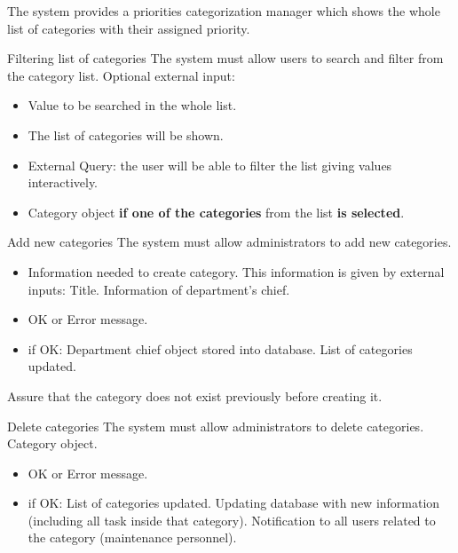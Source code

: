 
The system provides a priorities categorization manager which shows the whole list of categories with their assigned priority.

\begin{requirement}{Filtering list of categories}
\reqdesc The system must allow users to search and filter from the category list.
\reqin Optional external input:
\begin{itemize}
	\item Value to be searched in the whole list.
\end{itemize}
\reqout \begin{itemize}
	\item The list of categories will be shown.
	\item External Query: the user will be able to filter the list giving values interactively.
	\item Category object \textbf{if one of the categories} from the list \textbf{is selected}.
\end{itemize}
\end{requirement}


\begin{requirement}{Add new categories}
\reqdesc  The system must allow administrators to add new categories.
\reqin \begin{itemize}
	\item Information needed to create category. This information is given by external inputs:
		\subitem Title.
		\subitem Information of department's chief. 
\end{itemize}
\reqout \begin{itemize}
	\item OK or Error message.
	\item if OK:
		\subitem Department chief object stored into database.
		\subitem List of categories updated.
\end{itemize}
\reqsteps Assure that the category does not exist previously before creating it.
\end{requirement}

\begin{requirement}{Delete categories}
\reqdesc  The system must allow administrators to delete categories.
\reqin Category object.
\reqout \begin{itemize}
	\item OK or Error message.
	\item if OK:
		\subitem List of categories updated.
		\subitem Updating database with new information (including all task inside that category).
		\subitem Notification to all users related to the category (maintenance personnel).
\end{itemize}
\end{requirement}


